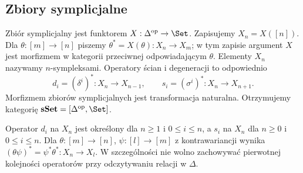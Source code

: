 \subsection{Zbiory symplicjalne}

\begin{definicja}\label{cat:def:simplicial-set}
Zbiór symplicjalny jest funktorem $X:\Delta^{\mathrm{op}}\to\Set$. Zapisujemy $X_n=X([n])$. Dla $\theta:[m]\to[n]$ piszemy $\theta^*=X(\theta):X_n\to X_m$; w tym zapisie argument $X$ jest morfizmem w kategorii przeciwnej odpowiadającym $\theta$. Elementy $X_n$ nazywamy $n$-sympleksami. Operatory ścian i degeneracji to odpowiednio
\[
 d_i=(\delta^i)^*:X_n\to X_{n-1},\qquad
 s_i=(\sigma^i)^*:X_n\to X_{n+1}.
\]
Morfizmem zbiorów symplicjalnych jest transformacja naturalna. Otrzymujemy kategorię $\mathbf{sSet}=[\Delta^{\mathrm{op}},\Set]$.
\end{definicja}

Operator $d_i$ na $X_n$ jest określony dla $n\geq1$ i $0\leq i\leq n$, a $s_i$ na $X_n$ dla $n\geq0$ i $0\leq i\leq n$. Dla $\theta:[m]\to[n]$, $\psi:[l]\to[m]$ z kontrawariancji wynika $(\theta\psi)^*=\psi^*\theta^*:X_n\to X_l$. W szczególności nie wolno zachowywać pierwotnej kolejności operatorów przy odczytywaniu relacji w $\Delta$.

